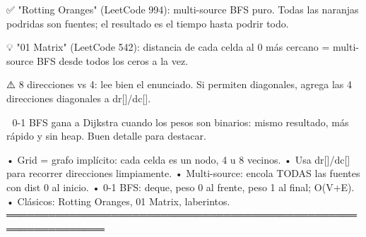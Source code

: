\begin{dsaentrevistas}

✅ "Rotting Oranges" (LeetCode 994): multi-source BFS puro. Todas las
   naranjas podridas son fuentes; el resultado es el tiempo hasta podrir
   todo.

💡 "01 Matrix" (LeetCode 542): distancia de cada celda al 0 más cercano
   = multi-source BFS desde todos los ceros a la vez.

⚠️ 8 direcciones vs 4: lee bien el enunciado. Si permiten diagonales,
   agrega las 4 direcciones diagonales a dr[]/dc[].

🔑 0-1 BFS gana a Dijkstra cuando los pesos son binarios: mismo
   resultado, más rápido y sin heap. Buen detalle para destacar.

\end{dsaentrevistas}

\begin{dsaresumen}

• Grid = grafo implícito: cada celda es un nodo, 4 u 8 vecinos.
• Usa dr[]/dc[] para recorrer direcciones limpiamente.
• Multi-source: encola TODAS las fuentes con dist 0 al inicio.
• 0-1 BFS: deque, peso 0 al frente, peso 1 al final; O(V+E).
• Clásicos: Rotting Oranges, 01 Matrix, laberintos.
════════════════════════════════════════════════════════════════

\end{dsaresumen}
